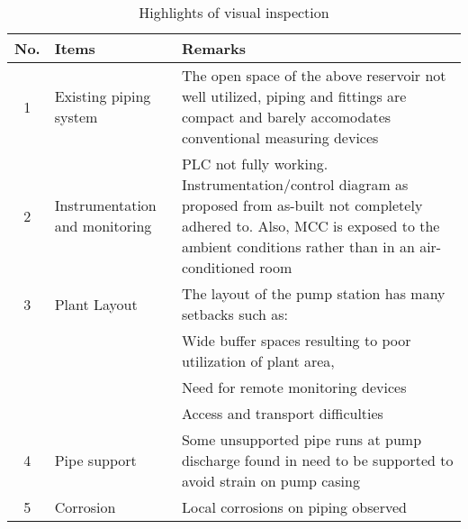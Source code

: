 \begin{table}[!htb]
	\caption{Highlights of visual inspection}
	\label{ch043_tbl_visualinspectionHL}
	{\scriptsize

\begin{tabular}{c|p{3cm}|p{9.5cm}}

\hline
No. & Items & Remarks \\ 
\hline
1 & Existing piping system & The open space of the above reservoir not well utilized, piping and fittings are compact and barely accomodates conventional measuring devices \\ 
2 & Instrumentation and monitoring & PLC not fully working. Instrumentation/control diagram as proposed from as-built not completely adhered to. Also, MCC is exposed to the ambient conditions rather than in an air-conditioned room \\ 
3 & Plant Layout & The layout of the pump station has many setbacks such as: \\ 
 &  & Wide buffer spaces resulting to poor utilization of plant area,  \\ 
 &  & Need for remote monitoring devices \\ 
 &  & Access and transport difficulties \\ 
4 & Pipe support & Some unsupported pipe runs at pump discharge found in need to be supported to avoid strain on pump casing \\ 
5 & Corrosion & Local corrosions on piping observed  \\ 
\hline

\end{tabular}
	}%
\end{table}